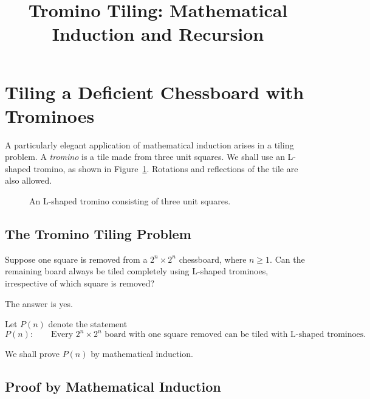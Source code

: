 \documentclass[12pt]{article}
\title{Tromino Tiling: Mathematical Induction and Recursion}
\author{}
\date{}
\begin{document}
\maketitle

\section{Tiling a Deficient Chessboard with Trominoes}

A particularly elegant application of mathematical induction arises in a
tiling problem. A \emph{tromino} is a tile made from three unit squares.
We shall use an L-shaped tromino, as shown in Figure~\ref{fig:tromino}.
Rotations and reflections of the tile are also allowed.

\begin{figure}[ht]
\centering
{}
\caption{An L-shaped tromino consisting of three unit squares.}
\label{fig:tromino}
\end{figure}


\subsection{The Tromino Tiling Problem}

Suppose one square is removed from a $2^n\times2^n$ chessboard,
where $n\geq1$. Can the remaining board always be tiled completely
using L-shaped trominoes, irrespective of which square is removed?

The answer is yes.

Let $P(n)$ denote the statement
\[
P(n):\qquad
\text{Every $2^n\times2^n$ board with one square removed
can be tiled with L-shaped trominoes.}
\]

We shall prove $P(n)$ by mathematical induction.


\subsection{Proof by Mathematical Induction}
\end{document}
